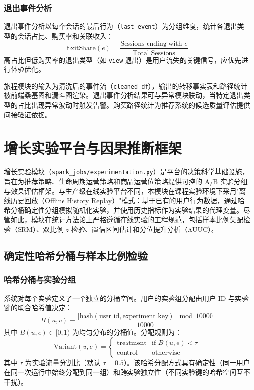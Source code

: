 \subsubsection{退出事件分析}

退出事件分析以每个会话的最后行为（\texttt{last\_event}）为分组维度，统计各退出类型的会话占比、购买率和关联收入：
\begin{equation}
    \text{ExitShare}(e) = \frac{\text{Sessions ending with } e}{\text{Total Sessions}}
    \label{eq:exit-share}
\end{equation}
高占比但低购买率的退出类型（如 \texttt{view} 退出）是用户流失的关键信号，应优先进行体验优化。

旅程模块的输入为清洗后的事件流（\texttt{cleaned\_df}），输出的转移事实表和路径统计被前端桑基图和漏斗图渲染。退出事件分析结果可与异常模块联动，当特定退出类型的占比出现异常波动时触发告警。购买路径统计为推荐系统的候选质量评估提供间接验证依据。

\section{增长实验平台与因果推断框架}

增长实验模块（\texttt{spark\_jobs/experimentation.py}）是平台的决策科学基础设施，旨在为推荐策略、生命周期运营策略和商品运营位策略提供可控的 A/B 实验分组与效果评估框架。与生产级在线实验平台不同，本模块在课程实验环境下采用"离线历史回放（Offline History Replay）"模式：基于已有的用户行为数据，通过哈希分桶确定性分组模拟随机化实验，并使用历史指标作为实验结果的代理变量。尽管如此，模块在统计方法论上严格遵循在线实验的工程规范，包括样本比例失配检验（SRM）、双比例 $z$ 检验、置信区间估计和分位提升分析（AUUC）。

\subsection{确定性哈希分桶与样本比例检验}

\subsubsection{哈希分桶与实验分组}

系统对每个实验定义了一个独立的分桶空间。用户的实验组分配由用户 ID 与实验键的联合哈希值决定：
\begin{equation}
    B(u, e) = \frac{|\text{hash}(\text{user\_id}, \text{experiment\_key})| \bmod 10000}{10000}
    \label{eq:hash-bucket}
\end{equation}
其中 $B(u, e) \in [0, 1)$ 为均匀分布的分桶值。分配规则为：
\begin{equation}
    \text{Variant}(u, e) = \begin{cases} \text{treatment} & \text{if } B(u, e) < \tau \\ \text{control} & \text{otherwise} \end{cases}
    \label{eq:variant-assignment}
\end{equation}
其中 $\tau$ 为实验流量分割比（默认 $\tau=0.5$）。该哈希分配方式具有确定性（同一用户在同一次运行中始终分配到同一组）和跨实验独立性（不同实验键的哈希空间互不干扰）。

